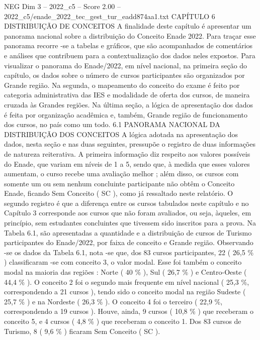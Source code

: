 \begin{textsample}{NEG Dim 3 – 2022\_c5 – Score 2.00 – 2022\_c5/enade\_2022\_tec\_gest\_tur\_eadd874aa1.txt}  \label{ex:f3_neg_219}
CAPÍTULO 6 DISTRIBUIÇÃO DE CONCEITOS A finalidade deste capítulo é apresentar um panorama nacional sobre a distribuição do Conceito Enade 2022.
Para traçar esse panorama recorre -se a tabelas e gráficos, que são acompanhados de comentários e análises que contribuem para a contextualização dos dados neles expostos.
Para visualizar o panorama do Enade/2022, em nível nacional, na primeira seção do capítulo, os dados sobre o número de cursos participantes são organizados por Grande região.
Na segunda, o mapeamento do conceito do exame é feito por categoria administrativa das IES e modalidade de oferta dos cursos, de maneira cruzada às Grandes regiões.
Na última seção, a lógica de apresentação dos dados é feita por organização acadêmica e, também, Grande região de funcionamento dos cursos, no país como um todo. 6.1 PANORAMA NACIONAL DA DISTRIBUIÇÃO DOS CONCEITOS A lógica adotada na apresentação dos dados, nesta seção e nas duas seguintes, pressupõe o registro de duas informações de natureza reiterativa.
A primeira informação diz respeito aos valores possíveis do Enade, que variam em níveis de 1 a 5, sendo que, à medida que esses valores aumentam, o curso recebe uma avaliação melhor ; além disso, os cursos com somente um ou sem nenhum concluinte participante não obtêm o Conceito Enade, ficando Sem Conceito ( SC ), como já ressaltado neste relatório.
O segundo registro é que a diferença entre os cursos tabulados neste capítulo e no Capítulo 3 corresponde aos cursos que não foram avaliados, ou seja, àqueles, em princípio, sem estudantes concluintes que tivessem sido inscritos para a prova.
Na Tabela 6.1, são apresentadas a quantidade e a distribuição de cursos de Turismo participantes do Enade/2022, por faixa de conceito e Grande região.
Observando -se os dados da Tabela 6.1, nota -se que, dos 83 cursos participantes, 22 ( 26,5 \% ) classificaram -se com conceito 3, o valor modal.
Esse foi também o conceito modal na maioria das regiões : Norte ( 40 \% ), Sul ( 26,7 \% ) e Centro-Oeste ( 44,4 \% ).
O conceito 2 foi o segundo mais frequente em nível nacional ( 25,3 \%, correspondendo a 21 cursos ), tendo sido o conceito modal na região Sudeste ( 25,7 \% ) e na Nordeste ( 26,3 \% ).
O conceito 4 foi o terceiro ( 22,9 \%, correspondendo a 19 cursos ).
Houve, ainda, 9 cursos ( 10,8 \% ) que receberam o conceito 5, e 4 cursos ( 4,8 \% ) que receberam o conceito 1.
Dos 83 cursos de Turismo, 8 ( 9,6 \% ) ficaram Sem Conceito ( SC ).

\end{textsample}
